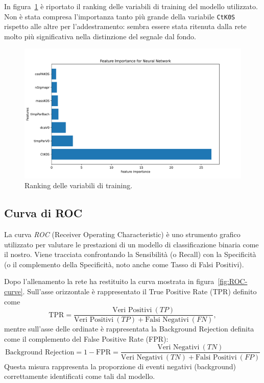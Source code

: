         In figura~\ref{fig:3-7-feature-importance} è riportato il ranking delle variabili di training del modello utilizzato. Non è stata compresa l'importanza tanto più grande della variabile \texttt{CtK0S} rispetto alle altre per l'addestramento: sembra essere stata ritenuta dalla rete molto più significativa nella distinzione del segnale dal fondo.
        
        \begin{figure}[h]
            \centering
            \includegraphics[width=1\linewidth]{res/fig/3-chapter/7-feature-importance.pdf}
            \caption{Ranking delle variabili di training.}
            \label{fig:3-7-feature-importance}
        \end{figure}

\newpage

    \subsection{Curva di ROC}
        La curva \textit{ROC} (Receiver Operating Characteristic) è uno strumento grafico utilizzato per valutare le prestazioni di un modello di classificazione binaria come il nostro. Viene tracciata confrontando la Sensibilità (o Recall) con la Specificità (o il complemento della Specificità, noto anche come Tasso di Falsi Positivi).

        Dopo l'allenamento la rete ha restituito la curva mostrata in figura~\ref{fig:ROC-curve}. Sull'asse orizzontale è rappresentato il True Positive Rate (TPR) definito come
        \begin{equation}
            \text{TPR} = \frac{\text{Veri Positivi}\ (TP)}{\text{Veri Positivi}\ (TP) + \text{Falsi Negativi}\ (FN)},
        \end{equation}
        mentre sull'asse delle ordinate è rappresentata la Background Rejection definita come il complemento del False Positive Rate (FPR):
        \begin{equation}
            \text{Background Rejection} = 1 - \text{FPR} = \frac{\text{Veri Negativi}\ (TN)}{\text{Veri Negativi}\ (TN) + \text{Falsi Positivi}\ (FP)}
        \end{equation}
        Questa misura rappresenta la proporzione di eventi negativi (background) correttamente identificati come tali dal modello.

